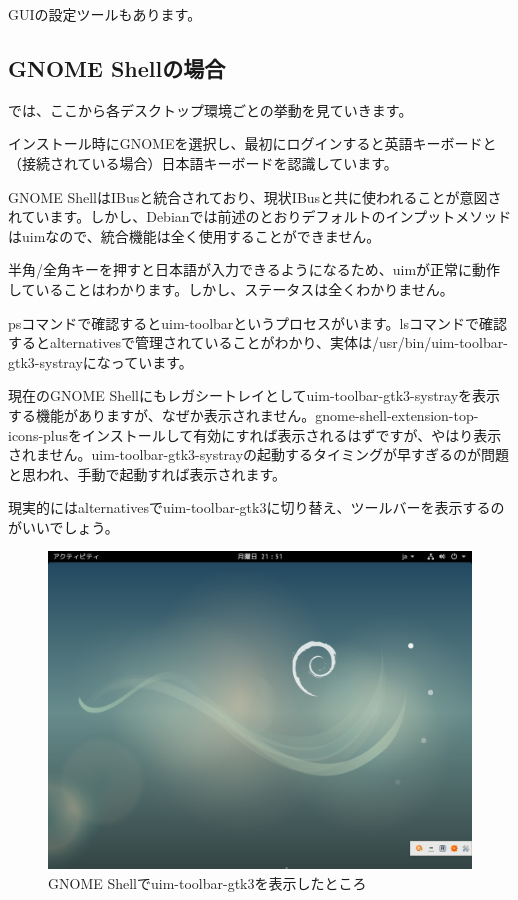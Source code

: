 \documentclass[mingoth,a4paper]{jsarticle}
\begin{document}
GUIの設定ツールもあります。

\pagebreak
\subsection{GNOME Shellの場合}

では、ここから各デスクトップ環境ごとの挙動を見ていきます。

インストール時にGNOMEを選択し、最初にログインすると英語キーボードと（接続されている場合）日本語キーボードを認識しています。

GNOME ShellはIBusと統合されており、現状IBusと共に使われることが意図されています。しかし、Debianでは前述のとおりデフォルトのインプットメソッドはuimなので、統合機能は全く使用することができません。

半角/全角キーを押すと日本語が入力できるようになるため、uimが正常に動作していることはわかります。しかし、ステータスは全くわかりません。

psコマンドで確認するとuim-toolbarというプロセスがいます。lsコマンドで確認するとalternativesで管理されていることがわかり、実体は/usr/bin/uim-toolbar-gtk3-systrayになっています。

現在のGNOME Shellにもレガシートレイとしてuim-toolbar-gtk3-systrayを表示する機能がありますが、なぜか表示されません。gnome-shell-extension-top-icons-plusをインストールして有効にすれば表示されるはずですが、やはり表示されません。uim-toolbar-gtk3-systrayの起動するタイミングが早すぎるのが問題と思われ、手動で起動すれば表示されます。

現実的にはalternativesでuim-toolbar-gtk3に切り替え、ツールバーを表示するのがいいでしょう。
\begin{figure}[htbp!]
  \centering
  \includegraphics[width=\linewidth]{image201708/gnome-uim-toolbar-gtk3.png}
  \caption{GNOME Shellでuim-toolbar-gtk3を表示したところ}
\end{figure}
\end{document}
